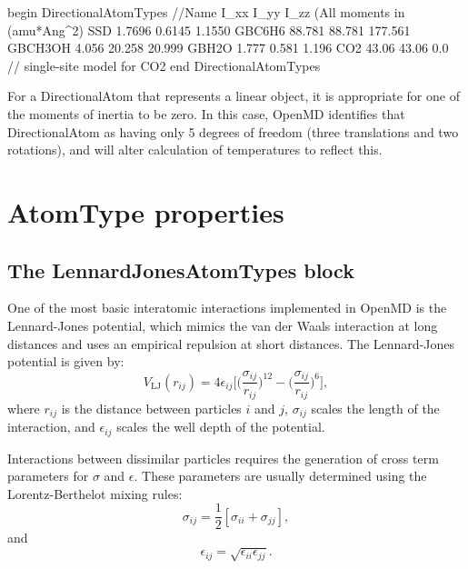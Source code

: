 \documentclass[]{book}
\begin{document}
\begin{code}[caption={[An example of a DirectionalAtomTypes block.] A
simple example of a DirectionalAtomTypes block.},
label={sch:datomTypesBlock}]
begin DirectionalAtomTypes
//Name          I_xx    I_yy    I_zz    (All moments in (amu*Ang^2)
SSD             1.7696  0.6145  1.1550  
GBC6H6          88.781  88.781  177.561
GBCH3OH         4.056   20.258  20.999
GBH2O           1.777   0.581   1.196
CO2             43.06   43.06   0.0    // single-site model for CO2
end DirectionalAtomTypes                    

\end{code}

For a DirectionalAtom that represents a linear object, it is
appropriate for one of the moments of inertia to be zero.  In this
case, OpenMD identifies that DirectionalAtom as having only 5 degrees
of freedom (three translations and two rotations), and will alter
calculation of temperatures to reflect this.

\section{\label{section::ffAtomProperties}AtomType properties}
\subsection{\label{section:ffLJ}The LennardJonesAtomTypes block}
One of the most basic interatomic interactions implemented in {\sc
  OpenMD} is the Lennard-Jones potential, which mimics the van der
Waals interaction at long distances and uses an empirical repulsion at
short distances. The Lennard-Jones potential is given by:
\begin{equation}
V_{\text{LJ}}(r_{ij}) = 
	4\epsilon_{ij} \biggl[
	\biggl(\frac{\sigma_{ij}}{r_{ij}}\biggr)^{12}
	- \biggl(\frac{\sigma_{ij}}{r_{ij}}\biggr)^{6}
	\biggr],
\label{eq:lennardJonesPot}
\end{equation}
where $r_{ij}$ is the distance between particles $i$ and $j$,
$\sigma_{ij}$ scales the length of the interaction, and
$\epsilon_{ij}$ scales the well depth of the potential.

Interactions between dissimilar particles requires the generation of
cross term parameters for $\sigma$ and $\epsilon$. These parameters
are usually determined using the Lorentz-Berthelot mixing
rules:\cite{Allen87}
\begin{equation}
\sigma_{ij} = \frac{1}{2}[\sigma_{ii} + \sigma_{jj}],
\label{eq:sigmaMix}
\end{equation}
and
\begin{equation}
\epsilon_{ij} = \sqrt{\epsilon_{ii} \epsilon_{jj}}.
\label{eq:epsilonMix}
\end{equation}
\end{document}
